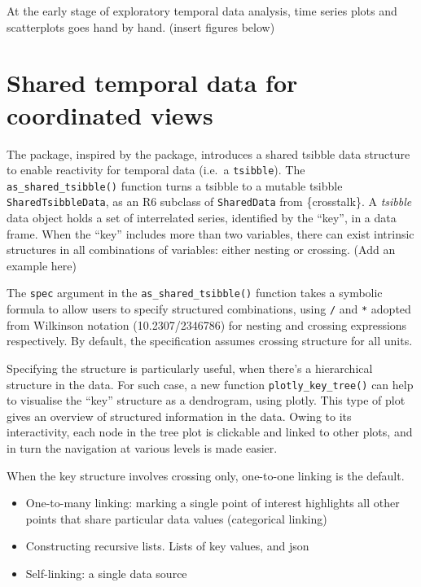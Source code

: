 At the early stage of exploratory temporal data analysis, time series
plots and scatterplots goes hand by hand. (insert figures below)

\hypertarget{shared-temporal-data-for-coordinated-views}{%
\section{Shared temporal data for coordinated
views}\label{shared-temporal-data-for-coordinated-views}}

The  package, inspired by the 
package, introduces a shared tsibble data structure to enable reactivity
for temporal data (i.e.~a \texttt{tsibble}). The
\texttt{as\_shared\_tsibble()} function turns a tsibble to a mutable
tsibble \texttt{SharedTsibbleData}, as an R6 subclass of
\texttt{SharedData} from \{crosstalk\}. A \emph{tsibble} data object
holds a set of interrelated series, identified by the ``key'', in a data
frame. When the ``key'' includes more than two variables, there can
exist intrinsic structures in all combinations of variables: either
nesting or crossing. (Add an example here)

The \texttt{spec} argument in the \texttt{as\_shared\_tsibble()}
function takes a symbolic formula to allow users to specify structured
combinations, using \texttt{/} and \texttt{*} adopted from Wilkinson
notation (10.2307/2346786) for nesting and crossing expressions
respectively. By default, the specification assumes crossing structure
for all units.

Specifying the structure is particularly useful, when there's a
hierarchical structure in the data. For such case, a new function
\texttt{plotly\_key\_tree()} can help to visualise the ``key'' structure
as a dendrogram, using plotly. This type of plot gives an overview of
structured information in the data. Owing to its interactivity, each
node in the tree plot is clickable and linked to other plots, and in
turn the navigation at various levels is made easier.

When the key structure involves crossing only, one-to-one linking is the
default.

\begin{itemize}
\tightlist
\item
  One-to-many linking: marking a single point of interest highlights all
  other points that share particular data values (categorical linking)
\item
  Constructing recursive lists. Lists of key values, and json
\item
  Self-linking: a single data source
\end{itemize}

